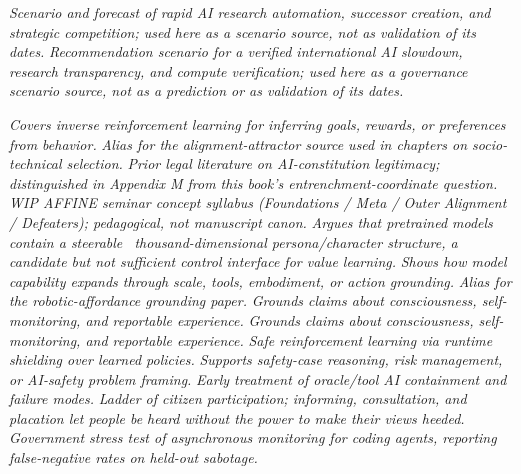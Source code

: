 \providecommand{\bibsummary}[2]{\expandafter\gdef\csname bibsummary@#1\endcsname{\small\itshape #2}}
\bibsummary{ai2027}{Scenario and forecast of rapid AI research automation, successor creation, and strategic competition; used here as a scenario source, not as validation of its dates.}
\bibsummary{ai2040}{Recommendation scenario for a verified international AI slowdown, research transparency, and compute verification; used here as a governance scenario source, not as a prediction or as validation of its dates.}

\bibsummary{abbeel2004apprenticeship}{Covers inverse reinforcement learning for inferring goals, rewards, or preferences from behavior.}
\bibsummary{abc2025}{Alias for the alignment-attractor source used in chapters on socio-technical selection.}
\bibsummary{abiri2025publicconstitutional}{Prior legal literature on AI-constitution legitimacy; distinguished in Appendix M from this book's entrenchment-coordinate question.}
\bibsummary{affine2026seminar}{WIP AFFINE seminar concept syllabus (Foundations / Meta / Outer Alignment / Defeaters); pedagogical, not manuscript canon.}
\bibsummary{africa2026thousand}{Argues that pretrained models contain a steerable ~thousand-dimensional persona/character structure, a candidate but not sufficient control interface for value learning.}
\bibsummary{ahn2022}{Shows how model capability expands through scale, tools, embodiment, or action grounding.}
\bibsummary{Ahn2022}{Alias for the robotic-affordance grounding paper.}
\bibsummary{albantakis2023iit4}{Grounds claims about consciousness, self-monitoring, and reportable experience.}
\bibsummary{albantakis2023integrated}{Grounds claims about consciousness, self-monitoring, and reportable experience.}
\bibsummary{alshiekh2018shield}{Safe reinforcement learning via runtime shielding over learned policies.}
\bibsummary{amodei2016concrete}{Supports safety-case reasoning, risk management, or AI-safety problem framing.}
\bibsummary{armstrong2010oracle}{Early treatment of oracle/tool AI containment and failure modes.}
\bibsummary{arnstein1969ladder}{Ladder of citizen participation; informing, consultation, and placation let people be heard without the power to make their views heeded.}
\bibsummary{aisi2026asyncmonitoring}{Government stress test of asynchronous monitoring for coding agents, reporting false-negative rates on held-out sabotage.}
